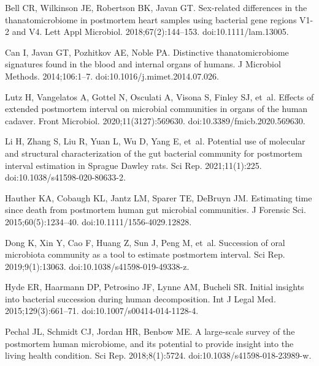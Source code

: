 \documentclass[
  10pt,
  letterpaper,
]{article}
\begin{document}
\begin{thebibliography}{10}
  Bell CR, Wilkinson JE, Robertson BK, Javan GT.
  \newblock Sex-related differences in the thanatomicrobiome in postmortem heart
    samples using bacterial gene regions {V1}-2 and {V4}.
  \newblock Lett Appl Microbiol. 2018;67(2):144--153.
  \newblock doi:{10.1111/lam.13005}.
  
  Can I, Javan GT, Pozhitkov AE, Noble PA.
  \newblock Distinctive thanatomicrobiome signatures found in the blood and
    internal organs of humans.
  \newblock J Microbiol Methods. 2014;106:1--7.
  \newblock doi:{10.1016/j.mimet.2014.07.026}.
  
  Lutz H, Vangelatos A, Gottel N, Osculati A, Visona S, Finley SJ, et~al.
  \newblock Effects of extended postmortem interval on microbial communities in
    organs of the human cadaver.
  \newblock Front Microbiol. 2020;11(3127):569630.
  \newblock doi:{10.3389/fmicb.2020.569630}.
  
  Li H, Zhang S, Liu R, Yuan L, Wu D, Yang E, et~al.
  \newblock Potential use of molecular and structural characterization of the gut
    bacterial community for postmortem interval estimation in {Sprague} {Dawley}
    rats.
  \newblock Sci Rep. 2021;11(1):225.
  \newblock doi:{10.1038/s41598-020-80633-2}.
  
  Hauther KA, Cobaugh KL, Jantz LM, Sparer TE, DeBruyn JM.
  \newblock Estimating time since death from postmortem human gut microbial
    communities.
  \newblock J Forensic Sci. 2015;60(5):1234--40.
  \newblock doi:{10.1111/1556-4029.12828}.
  
  Dong K, Xin Y, Cao F, Huang Z, Sun J, Peng M, et~al.
  \newblock Succession of oral microbiota community as a tool to estimate
    postmortem interval.
  \newblock Sci Rep. 2019;9(1):13063.
  \newblock doi:{10.1038/s41598-019-49338-z}.
  
  Hyde ER, Haarmann DP, Petrosino JF, Lynne AM, Bucheli SR.
  \newblock Initial insights into bacterial succession during human
    decomposition.
  \newblock Int J Legal Med. 2015;129(3):661--71.
  \newblock doi:{10.1007/s00414-014-1128-4}.
  
  Pechal JL, Schmidt CJ, Jordan HR, Benbow ME.
  \newblock A large-scale survey of the postmortem human microbiome, and its
    potential to provide insight into the living health condition.
  \newblock Sci Rep. 2018;8(1):5724.
  \newblock doi:{10.1038/s41598-018-23989-w}.
  

\end{thebibliography}
\end{document}
